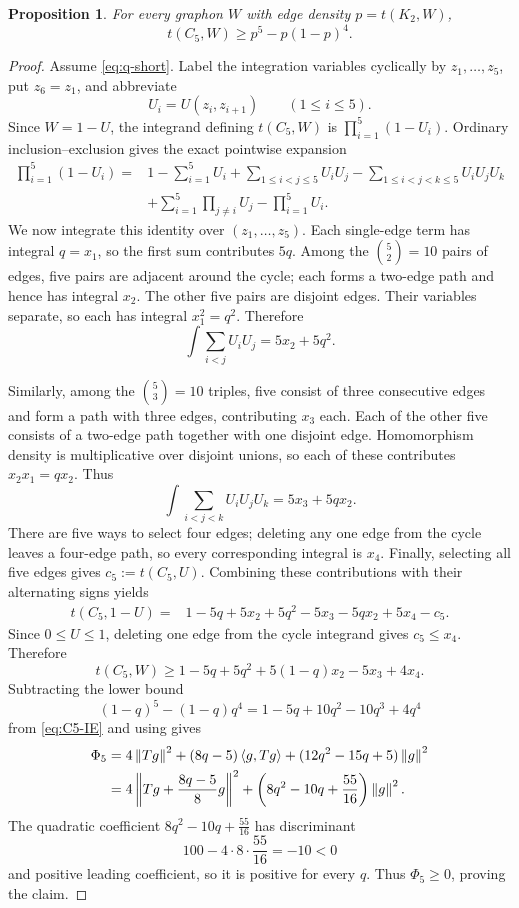 ﻿\documentclass[11pt]{article}
\newtheorem{proposition}[theorem]{Proposition}
\numberwithin{equation}{section}
\newcommand{\ip}[2]{\left\langle #1,#2\right\rangle}
\newcommand{\norm}[1]{\left\lVert #1\right\rVert}
\begin{document}
\begin{proposition}\label{prop:C5}
  For every graphon $W$ with edge density $p=t(K_2,W)$,
  \[
    t(C_5,W)\ge p^5-p(1-p)^4.
  \]
\end{proposition}

\begin{proof}
  Assume \eqref{eq:q-short}.
  Label the integration variables cyclically by $z_1,\ldots,z_5$, put $z_6=z_1$, and abbreviate
  \[
    U_i=U(z_i,z_{i+1})\qquad(1\le i\le5).
  \]
  Since $W=1-U$, the integrand defining $t(C_5,W)$ is $\prod_{i=1}^5(1-U_i)$.
  Ordinary inclusion--exclusion gives the exact pointwise expansion
  \begin{align*}
    \prod_{i=1}^5(1-U_i)
    ={}&1-\sum_{i=1}^5U_i
    +\sum_{1\le i<j\le5}U_iU_j
    -\sum_{1\le i<j<k\le5}U_iU_jU_k\\
    &+\sum_{i=1}^5\prod_{j\ne i}U_j
    -\prod_{i=1}^5U_i.
  \end{align*}
  We now integrate this identity over $(z_1,\ldots,z_5)$.
  Each single-edge term has integral $q=x_1$, so the first sum contributes $5q$.
  Among the $\binom52=10$ pairs of edges, five pairs are adjacent around the cycle; each forms a two-edge path and hence has integral $x_2$.
  The other five pairs are disjoint edges.
  Their variables separate, so each has integral $x_1^2=q^2$.
  Therefore
  \[
    \int\sum_{i<j}U_iU_j=5x_2+5q^2.
  \]

  Similarly, among the $\binom53=10$ triples, five consist of three consecutive edges and form a path with three edges, contributing $x_3$ each.
  Each of the other five consists of a two-edge path together with one disjoint edge.
  Homomorphism density is multiplicative over disjoint unions, so each of these contributes $x_2x_1=qx_2$.
  Thus
  \[
    \int\sum_{i<j<k}U_iU_jU_k=5x_3+5qx_2.
  \]
  There are five ways to select four edges; deleting any one edge from the cycle leaves a four-edge path, so every corresponding integral is $x_4$.
  Finally, selecting all five edges gives $c_5:=t(C_5,U)$.
  Combining these contributions with their alternating signs yields
  \begin{align*}
    t(C_5,1-U)
    ={}&1-5q+5x_2+5q^2-5x_3-5qx_2+5x_4-c_5.
  \end{align*}
  Since $0\le U\le1$, deleting one edge from the cycle integrand gives $c_5\le x_4$.
  Therefore
  \begin{equation}\label{eq:C5-IE}
    t(C_5,W)\ge1-5q+5q^2+5(1-q)x_2-5x_3+4x_4.
  \end{equation}
  Subtracting the lower bound
  \[
    (1-q)^5-(1-q)q^4=1-5q+10q^2-10q^3+4q^4
  \]
  from \eqref{eq:C5-IE} and using  gives
  \begin{align}
    \Phi_5={}&4\norm{Tg}^2+(8q-5)\ip g{Tg}
    +(12q^2-15q+5)\norm g^2 \notag\\
    ={}&4\left\|Tg+\frac{8q-5}{8}g\right\|^2
    +\left(8q^2-10q+\frac{55}{16}\right)\norm g^2. \label{eq:Phi5}
  \end{align}
  The quadratic coefficient $8q^2-10q+\frac{55}{16}$ has discriminant
  \[
    100-4\cdot8\cdot\frac{55}{16}=-10<0
  \]
  and positive leading coefficient, so it is positive for every $q$.
  Thus $\Phi_5\ge0$, proving the claim.
\end{proof}
\end{document}
